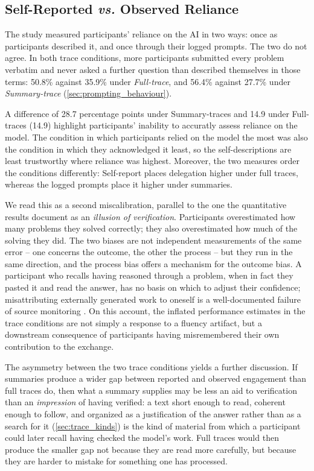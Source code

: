 \documentclass[manuscript,review,anonymous]{acmart}
\begin{document}
\subsection{Self-Reported \textit{vs.} Observed Reliance}\label{sec:disc_selfreport} 

The study measured participants' reliance on the AI in two ways: once as participants described it, and once through their logged prompts. The two do not agree. In both trace conditions, more participants submitted every problem verbatim and never asked a further question than described themselves in those terms: 50.8\% against 35.9\% under \textit{Full-trace}, and 56.4\% against 27.7\% under \textit{Summary-trace} (\autoref{sec:prompting_behaviour}). 


A difference of 28.7 percentage points under Summary-traces and 14.9 under Full-traces (14.9) highlight participants' inability to accuratly assess reliance on the model.
The condition in which participants relied on the model the most was also the condition in which they acknowledged it least, so the self-descriptions are least trustworthy where reliance was highest. Moreover, the two measures order the conditions differently: Self-report places delegation higher under full traces, whereas the logged prompts place it higher under summaries.


We read this as a second miscalibration, parallel to the one the quantitative results document as an \emph{illusion of verification}. Participants overestimated how many problems they solved correctly; they also overestimated how much of the solving they did. The two biases are not independent measurements of the same error -- one concerns the outcome, the other the process -- but they run in the same direction, and the process bias offers a mechanism for the outcome bias. A participant who recalls having reasoned through a problem, when in fact they pasted it and read the answer, has no basis on which to adjust their confidence; misattributing externally generated work to oneself is a well-documented failure of source monitoring \cite{johnson_source_1993, Zindulka2026AIMemoryGap}. On this account, the inflated performance estimates in the trace conditions are not simply a response to a fluency artifact, but a downstream consequence of participants having misremembered their own contribution to the exchange.

The asymmetry between the two trace conditions yields a further discussion. If summaries produce a wider gap between reported and observed engagement than full traces do, then what a summary supplies may be less an aid to verification than an \emph{impression} of having verified: a text short enough to read, coherent enough to follow, and organized as a justification of the answer rather than as a search for it (\autoref{sec:trace_kinds}) is the kind of material from which a participant could later recall having checked the model's work. Full traces would then produce the smaller gap not because they are read more carefully, but because they are harder to mistake for something one has processed. 
\end{document}
